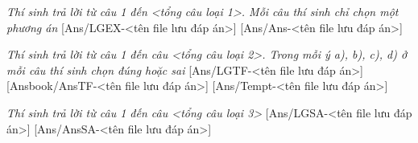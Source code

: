\documentclass[Main.tex]{subfiles}
\begin{document}
\textit{\large Thí sinh trả lời từ câu 1 đến <tổng câu loại 1>. Mỗi câu thí sinh chỉ chọn một phương án}
[Ans/LGEX-<tên file lưu đáp án>]
[Ans/Ans-<tên file lưu đáp án>]

\textit{\large Thí sinh trả lời từ câu 1 đến câu <tổng câu loại 2>. Trong mỗi ý a), b), c), d) ở mỗi câu thí sinh chọn đúng hoặc sai}
[Ans/LGTF-<tên file lưu đáp án>]
[Ansbook/AnsTF-<tên file lưu đáp án>]
[Ans/Tempt-<tên file lưu đáp án>]
\setcounter{ex}{0}

\textit{\large Thí sinh trả lời từ câu 1 đến câu <tổng câu loại 3>}
[Ans/LGSA-<tên file lưu đáp án>]
[Ans/AnsSA-<tên file lưu đáp án>]
\setcounter{ex}{0}
\end{document}
